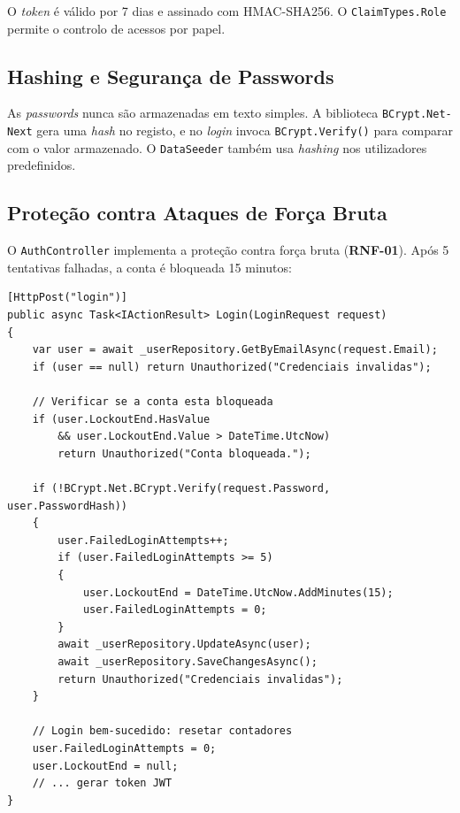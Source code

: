 O \textit{token} é válido por 7 dias e assinado com HMAC-SHA256. O \texttt{ClaimTypes.Role} permite o controlo de acessos por papel.

\subsection{Hashing e Segurança de Passwords}

As \textit{passwords} nunca são armazenadas em texto simples. A biblioteca \texttt{BCrypt.Net-Next} gera uma \textit{hash} no registo, e no \textit{login} invoca \texttt{BCrypt.Verify()} para comparar com o valor armazenado. O \texttt{DataSeeder} também usa \textit{hashing} nos utilizadores predefinidos.

\subsection{Proteção contra Ataques de Força Bruta}

O \texttt{AuthController} implementa a proteção contra força bruta (\textbf{RNF-01}). Após 5 tentativas falhadas, a conta é bloqueada 15 minutos:

\begin{lstlisting}[language={[Sharp]C},basicstyle=\ttfamily\small,breaklines=true,frame=single,caption={Mecanismo de bloqueio por tentativas de \textit{login} falhadas.},label={lst:lockout}]
[HttpPost("login")]
public async Task<IActionResult> Login(LoginRequest request)
{
    var user = await _userRepository.GetByEmailAsync(request.Email);
    if (user == null) return Unauthorized("Credenciais invalidas");

    // Verificar se a conta esta bloqueada
    if (user.LockoutEnd.HasValue
        && user.LockoutEnd.Value > DateTime.UtcNow)
        return Unauthorized("Conta bloqueada.");

    if (!BCrypt.Net.BCrypt.Verify(request.Password, user.PasswordHash))
    {
        user.FailedLoginAttempts++;
        if (user.FailedLoginAttempts >= 5)
        {
            user.LockoutEnd = DateTime.UtcNow.AddMinutes(15);
            user.FailedLoginAttempts = 0;
        }
        await _userRepository.UpdateAsync(user);
        await _userRepository.SaveChangesAsync();
        return Unauthorized("Credenciais invalidas");
    }

    // Login bem-sucedido: resetar contadores
    user.FailedLoginAttempts = 0;
    user.LockoutEnd = null;
    // ... gerar token JWT
}
\end{lstlisting}


